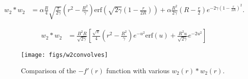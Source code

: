 \documentclass[letterpaper,twocolumn,amsmath,amssymb,prb]{revtex4-1}
\begin{document}
\begin{widetext}
\begin{align*}
  w_2\ast w_2 &= \alpha \frac{R}{4}\sqrt{\frac{\pi}{2\gamma}}
               \left( r^2 - \frac{R^2}{\gamma}
               \right)\textrm{erf} \left( \sqrt{2\gamma} \left(1 - \frac{r}{2R}
               \right) \right)%
               + \alpha \frac{R^2}{2\gamma} \left( R - \frac{r}{2}
               \right) e^{-2\gamma \left( 1 - \frac{r}{2R} \right)^2}.
\end{align*}
\end{widetext}
\begin{align*}
  w_2\ast w_2 &= \frac{B^2 R}{\sqrt{2\gamma}} \left[
               \frac{\sqrt{\pi}}{4} \left( r^2 - \frac{R^2}{\gamma}
               \right) e^{-u^2} \textrm{erf}(u)
               + \frac{R^2 u}{\sqrt{2\gamma}}
               e^{-2u^2} \right]
\end{align*}

\begin{figure}
\begin{center}
\texttt{[image: figs/w2convolves]}
\end{center}
\caption{Comparison of the $-f'(r)$ function with various $w_2(r)\ast
  w_2(r)$.}
\label{fig:w2convolves}
\end{figure}
\end{document}
